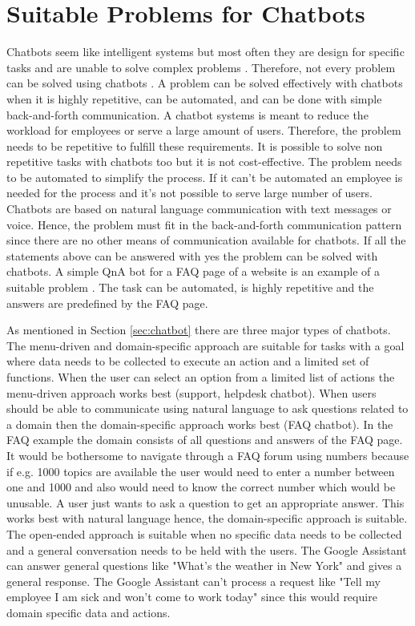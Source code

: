 \section{Suitable Problems for Chatbots} 
Chatbots seem like intelligent systems but most often they are design for specific tasks
and are unable to solve complex problems \cite{buiildChatbotsPython}.
Therefore, not every problem can be solved using chatbots \cite{buiildChatbotsPython}.
A problem can be solved effectively with chatbots when it is highly repetitive, can be automated, and 
can be done with simple back-and-forth communication.
A chatbot systems is meant to reduce the workload for employees or serve a large amount of users.
Therefore, the problem needs to be repetitive to fulfill these requirements.
It is possible to solve non repetitive tasks with chatbots too but it is not cost-effective.
The problem needs to be automated to simplify the process.
If it can't be automated an employee is needed for the process and it's not possible to 
serve large number of users.
Chatbots are based on natural language communication with text messages or voice.
Hence, the problem must fit in the back-and-forth communication pattern since there are no 
other means of communication available for chatbots.
If all the statements above can be answered with yes the problem can be solved with chatbots. 
A simple QnA bot for a FAQ page of a website is an example of a suitable problem \cite{buiildChatbotsPython}.
The task can be automated, is highly repetitive and the answers are predefined by the FAQ page.

As mentioned in Section \ref{sec:chatbot} there are three major types of chatbots.
The menu-driven and domain-specific approach are suitable for tasks with a goal where data needs to
be collected to execute an action and a limited set of functions. 
When the user can select an option from a limited list of actions the menu-driven approach works best
(support, helpdesk chatbot).
When users should be able to communicate using natural language to ask questions related to a
domain then the domain-specific approach works best (FAQ chatbot). In the FAQ example the domain 
consists of all questions and answers of the FAQ page.
It would be bothersome to navigate through a FAQ forum using numbers because if e.g. 1000 topics
are available the user would need to enter a number between one and 1000 and also would need to 
know the correct number which would be unusable.
A user just wants to ask a question to get an appropriate answer.
This works best with natural language hence, the domain-specific approach is suitable.
The open-ended approach is suitable when no specific data needs to be collected and a general 
conversation needs to be held with the users. 
The Google Assistant can answer general questions like "What's the weather in New York" and 
gives a general response.
The Google Assistant can't process a request like 
"Tell my employee I am sick and won't come to work today" since this would require domain specific 
data and actions.



